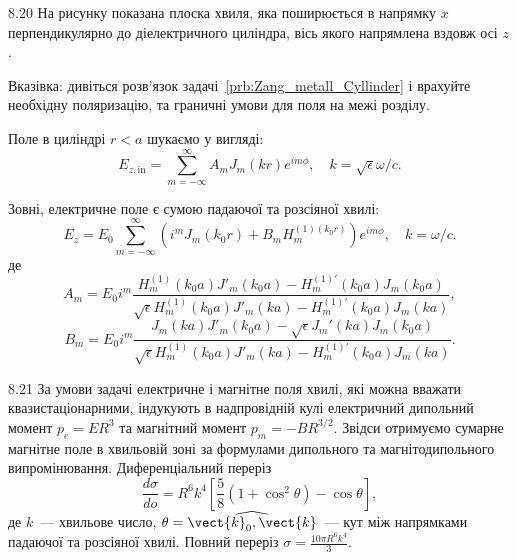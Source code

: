\begin{Solution}{8.{20}}
	На рисунку показана плоска хвиля, яка поширюється в напрямку $x$ перпендикулярно до діелектричного
	циліндра, вісь якого напрямлена вздовж осі $z$.

	\begin{center}
	\end{center}

	Вказівка: дивіться розв'язок задачі~\ref{prb:Zang_metall_Cyllinder} і врахуйте необхідну
	поляризацію, та граничні умови для поля на межі розділу.

	Поле в циліндрі $r < a$ шукаємо у вигляді:
	\[
		E_{z,\text{in}} = \sum\limits_{m = -\infty}^{\infty}A_mJ_m(kr)e^{im\phi}, \quad
		k=\sqrt{\epsilon} \omega/c.
	\]

	Зовні, електричне поле є сумою падаючої та розсіяної хвилі:
	\[
		E_z = E_0 \sum\limits_{m = -\infty}^{\infty} \left( i^m J_m(k_0 r) + B_m H_m^{(1)(k_0r)}
		\right) e^{im\phi}, \quad k= \omega/c.
	\]
	де
	\[
		A_m = E_0i^m \frac{  H_m^{(1)}(k_0a) J'_m(k_0a) - H_m^{(1)\prime}(k_0a) J_m(k_0a)    }{
		\sqrt{\epsilon} H_m^{(1)}(k_0a) J'_m(ka) - H_m^{(1)\prime}(k_0a) J_m(ka)},
	\]
	\[
		B_m = E_0i^m \frac{  J_m(ka) J'_m(k_0a) - \sqrt{\epsilon} J_m'(ka) J_m(k_0a)    }{
		\sqrt{\epsilon} H_m^{(1)}(k_0a) J'_m(ka) - H_m^{(1)\prime}(k_0a) J_m(ka)}.
	\]

\end{Solution}
\begin{Solution}{8.{21}}
	За умови задачі  електричне і магнітне поля хвилі, які можна вважати квазистаціонарними, індукують
	в надпровідній кулі електричний дипольний момент $p_e=ER^3$ та магнітний момент $p_m=-BR^{3/2}$.
	Звідси отримуємо сумарне магнітне поле в хвильовій зоні за формулами дипольного та
	магнітодипольного випромінювання.
	Диференціальний переріз
	\[
		\frac{d\sigma}{do} = R^6 k^4 \left[\frac58 (1 + \cos^2\theta) -\cos\theta\right],
	\]
	де $k$~--- хвильове число, $\theta = \widehat{\vect{k}_0,\vect{k}}$~--- кут між напрямками
	падаючої та розсіяної хвилі.
	Повний переріз $\sigma = \frac{10\pi R^6 k^4}{3}$.
\end{Solution}
